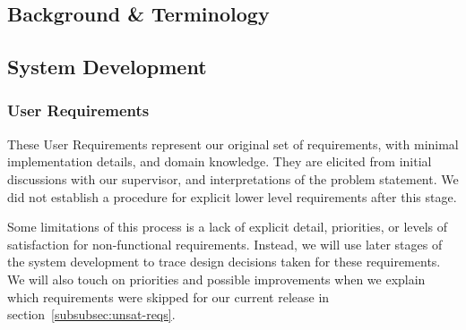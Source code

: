     \subsection{Background \& Terminology}\label{subsec:background-&-terminology}

\subsection{System Development}
\label{subsec:system-development}
\subsubsection{User Requirements}\label{subsubsec:user-reqs}

These User Requirements represent our original set of requirements, with minimal implementation details, and domain knowledge.
They are elicited from initial discussions with our supervisor,
and interpretations of the problem statement.
We did not establish a procedure for explicit lower level requirements after this stage.

Some limitations of this process is a lack of explicit detail, priorities, or levels of satisfaction for non-functional requirements.
Instead, we will use later stages of the system development to trace design decisions taken for these requirements.
We will also touch on priorities and possible improvements when we explain
which requirements were skipped for our current release in section~\ref{subsubsec:unsat-reqs}.

